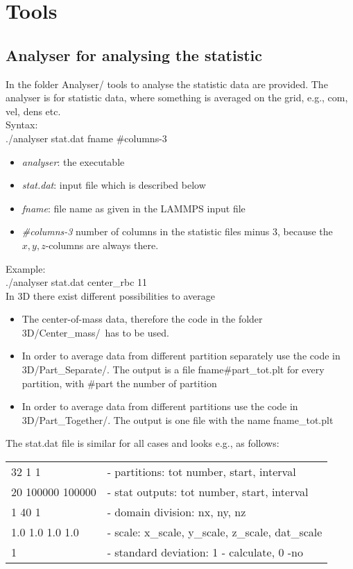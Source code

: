 \chapter{Tools}

\section{Analyser for analysing the statistic}

In the folder \glqq Analyser/ \grqq tools to analyse the statistic data are provided.
The analyser is for statistic data, where something is averaged on the grid, e.g., com, vel, dens etc.
\\[1ex]
Syntax:\\[0.5ex]
./analyser stat.dat fname \#columns-3
\begin{itemize}
\item \textit{analyser}: the executable
\item \textit{stat.dat}: input file which is described below
\item \textit{fname}: file name as given in the LAMMPS input file
\item \textit{\#columns-3} number of columns in the statistic files minus 3, because the $x,y,z$-columns are always there.
\end{itemize}
Example:\\[0.5ex]
./analyser stat.dat center\_rbc 11
\\[2ex]
In 3D there exist different possibilities to average
\begin{itemize}
\item The center-of-mass data, therefore the code in the folder \glqq3D/Center\_mass/\grqq\ has to be used.
\item In order to average data from different partition separately use the code in \glqq3D/Part\_Separate/\grqq. The output is a file fname\#part\_tot.plt for every partition, with \#part the number of partition
\item In order to average data from different partitions use the code in \glqq3D/Part\_Together/\grqq. The output is one file with the name fname\_tot.plt
\end{itemize}
The stat.dat file is similar for all cases and looks e.g., as follows:
\begin{table}[h!]
  \begin{tabular}{ll}
    32 1 1       & - partitions: tot number, start, interval\\
20 100000 100000 & - stat outputs: tot number, start, interval\\
1 40 1           & - domain division: nx, ny, nz\\
1.0 1.0 1.0 1.0  & - scale: x\_scale, y\_scale, z\_scale, dat\_scale\\
1                & - standard deviation: 1 - calculate, 0 -no\\
  \end{tabular}
\end{table}
